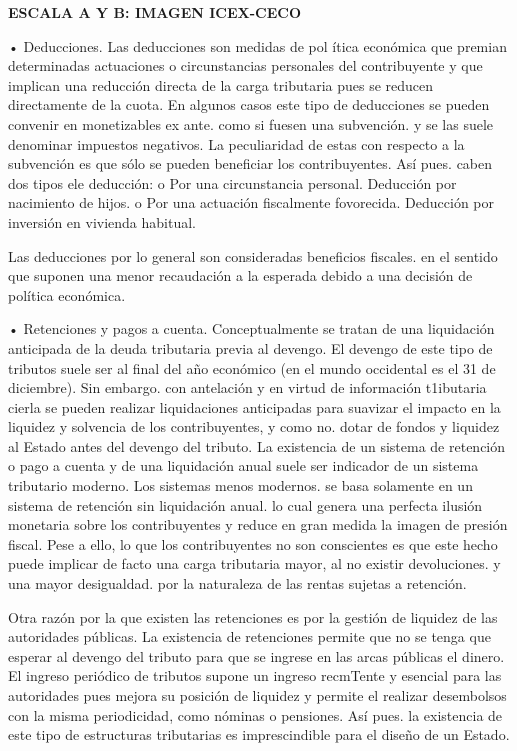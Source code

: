 \documentclass[10pt,a4paper]{article}
\begin{document}
\textbf{ESCALA A Y B: IMAGEN ICEX-CECO}

• Deducciones.
Las deducciones son medidas de pol ítica económica que premian determinadas actuaciones
o circunstancias personales del contribuyente y que implican una reducción directa de la carga
tributaria pues se reducen directamente de la cuota. En algunos casos este tipo de deducciones
se pueden convenir en monetizables ex ante. como si fuesen una subvención. y se las suele
denominar impuestos negativos. La peculiaridad de estas con respecto a la subvención es que
sólo se pueden beneficiar los contribuyentes.
Así pues. caben dos tipos ele deducción:
o Por una circunstancia personal. Deducción por nacimiento de hijos.
o Por una actuación fiscalmente fovorecida. Deducción por inversión en vivienda
habitual.

Las deducciones por lo general son consideradas beneficios fiscales. en el sentido que suponen una menor recaudación a la esperada debido a una decisión de política económica.

• Retenciones y pagos a cuenta.
Conceptualmente se tratan de una liquidación anticipada de la deuda tributaria previa al devengo. El devengo de este tipo de tributos suele ser al final del año económico (en el mundo occidental es el 31 de diciembre). Sin embargo. con antelación y en virtud de información t1ibutaria cierla se pueden realizar liquidaciones anticipadas para suavizar el impacto en la liquidez y solvencia de los contribuyentes, y como no. dotar de fondos y liquidez al Estado antes del devengo del tributo. La existencia de un sistema de retención o pago a cuenta y de una liquidación anual suele ser indicador de un sistema tributario moderno. Los sistemas menos modernos. se basa solamente en un sistema de retención sin liquidación anual. lo cual genera una perfecta ilusión monetaria sobre los contribuyentes y reduce en gran medida la imagen de presión fiscal. Pese a ello, lo que los contribuyentes no son conscientes es que este hecho puede implicar de facto una carga tributaria mayor, al no existir devoluciones. y una mayor desigualdad. por la naturaleza de las rentas sujetas a retención.

Otra razón por la que existen las retenciones es por la gestión de liquidez de las autoridades públicas. La existencia de retenciones permite que no se tenga que esperar al devengo del tributo para que se ingrese en las arcas públicas el dinero. El ingreso periódico de tributos supone un ingreso recmTente y esencial para las autoridades pues mejora su posición de liquidez y permite el realizar desembolsos con la misma periodicidad, como nóminas o pensiones. Así pues. la existencia de este tipo de estructuras tributarias es imprescindible para el diseño de un Estado.
\end{document}
